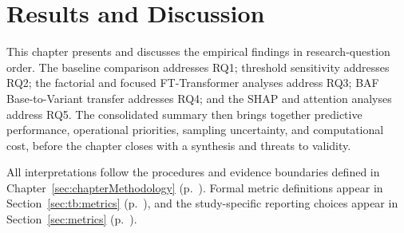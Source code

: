\chapter{Results and Discussion}
\label{sec:chapterResults}

\raggedbottom




This chapter presents and discusses the empirical findings in research-question order. The baseline comparison addresses RQ1; threshold sensitivity addresses RQ2; the factorial and focused FT-Transformer analyses address RQ3; BAF Base-to-Variant transfer addresses RQ4; and the SHAP and attention analyses address RQ5. The consolidated summary then brings together predictive performance, operational priorities, sampling uncertainty, and computational cost, before the chapter closes with a synthesis and threats to validity.

All interpretations follow the procedures and evidence boundaries defined in Chapter~\ref{sec:chapterMethodology} (p.~\pageref{sec:chapterMethodology}). Formal metric definitions appear in Section~\ref{sec:tb:metrics} (p.~\pageref{sec:tb:metrics}), and the study-specific reporting choices appear in Section~\ref{sec:metrics} (p.~\pageref{sec:metrics}).

